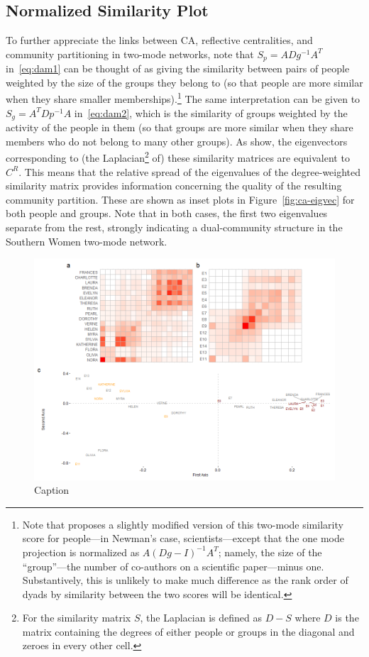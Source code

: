 \documentclass[a4paper,fleqn]{cas-sc}
\begin{document}
\subsection{Normalized Similarity Plot}
To further appreciate the links between CA, reflective centralities, and community partitioning in two-mode networks, note that $S_p = ADg^{-1}A^T$ in~\ref{eq:dam1} can be thought of as giving the similarity between pairs of people weighted by the size of the groups they belong to (so that people are more similar when they share smaller memberships).\footnote{Note that \citet[eq.2]{newman2001scientific} proposes a slightly modified version of this two-mode similarity score for people---in Newman's case, scientists---except that the one mode projection is normalized as $A(Dg - I)^{-1}A^T$; namely, the size of the ``group''---the number of co-authors on a scientific paper---minus one. Substantively, this is unlikely to make much difference as the rank order of dyads by similarity between the two scores will be identical.} The same interpretation can be given to $S_g = A^TDp^{-1}A$ in~\ref{eq:dam2}, which is the similarity of groups weighted by the activity of the people in them (so that groups are more similar when they share members who do not belong to many other groups). As \citet{van2021correspondence} show, the eigenvectors corresponding to (the Laplacian\footnote{For the similarity matrix $S$, the Laplacian is defined as $D-S$ where $D$ is the matrix containing the degrees of either people or groups in the diagonal and zeroes in every other cell.} of) these similarity matrices are equivalent to $C^R$. This means that the relative spread of the eigenvalues of the degree-weighted similarity matrix provides information concerning the quality of the resulting community partition. These are shown as inset plots in Figure~\ref{fig:ca-eigvec} for both people and groups. Note that in both cases, the first two eigenvalues separate from the rest, strongly indicating a dual-community structure in the Southern Women two-mode network. 

\begin{figure}
    \centering
    \includegraphics[width=1.0\textwidth]{Plots/ca-sim.png}
    \caption{Caption}
    \label{fig:ca-sim}
\end{figure}
\end{document}
